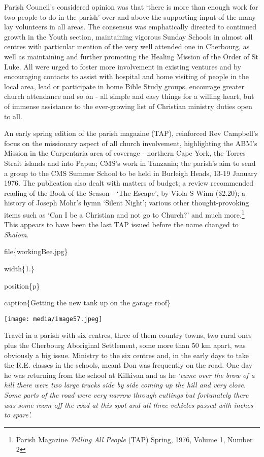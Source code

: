 Parish Council's considered opinion was that `there is more than enough work for two people to do in the parish' over and above the supporting input of the many lay volunteers in all areas. The consensus was emphatically directed to continued growth in the Youth section, maintaining vigorous Sunday Schools in almost all centres with particular mention of the very well attended one in Cherbourg, as well as maintaining and further promoting the Healing Mission of the Order of St Luke. All were urged to foster more involvement in existing ventures and by encouraging contacts to assist with hospital and home visiting of people in the local area, lead or participate in home Bible Study groups, encourage greater church attendance and so on - all simple and easy things for a willing heart, but of immense assistance to the ever-growing list of Christian ministry duties open to all.

An early spring edition of the parish magazine (TAP), reinforced Rev Campbell's focus on the missionary aspect of all church involvement, highlighting the ABM's Mission in the Carpentaria area of coverage - northern Cape York, the Torres Strait islands and into Papua; CMS's work in Tanzania; the parish's aim to send a group to the CMS Summer School to be held in Burleigh Heads, 13-19 January 1976. The publication also dealt with matters of budget; a review recommended reading of the Book of the Season - `The Escape', by Viola S Winn (\$2.20); a history of Joseph Mohr's hymn `Silent Night'; various other thought-provoking items such as `Can I be a Christian and not go to Church?' and much more.\footnote{Parish Magazine \emph{Telling All People} (TAP) Spring, 1976, Volume 1, Number 2} This appears to have been the last TAP issued before the name changed to \emph{Shalom}.

file\{workingBee.jpg\}

width\{1.\}

position\{p\}

caption\{Getting the new tank up on the garage roof\}

\texttt{[image: media/image57.jpeg]}

Travel in a parish with six centres, three of them country towns, two rural ones plus the Cherbourg Aboriginal Settlement, some more than 50 km apart, was obviously a big issue. Ministry to the six centres and, in the early days to take the R.E. classes in the schools, meant Don was frequently on the road. One day he was returning from the school at Kilkivan and as he \emph{`came over the brow of a hill there were two large trucks side by side coming up the hill and very close. Some parts of the road were very narrow through cuttings but fortunately there was some room off the road at this spot and all three vehicles passed with inches to spare'.}

